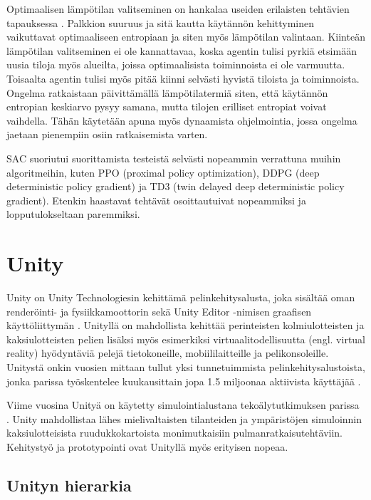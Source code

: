 \documentclass[utf8]{gradu3}
\begin{document}
Optimaalisen lämpötilan valitseminen on hankalaa useiden erilaisten tehtävien tapauksessa \parencite{haarnoja2018app}. Palkkion suuruus ja sitä kautta käytännön kehittyminen vaikuttavat optimaaliseen entropiaan ja siten myös lämpötilan valintaan. Kiinteän lämpötilan valitseminen ei ole kannattavaa, koska agentin tulisi pyrkiä etsimään uusia tiloja myös alueilta, joissa optimaalisista toiminnoista ei ole varmuutta. Toisaalta agentin tulisi myös pitää kiinni selvästi hyvistä tiloista ja toiminnoista. Ongelma ratkaistaan päivittämällä lämpötilatermiä siten, että käytännön entropian keskiarvo pysyy samana, mutta tilojen erilliset entropiat voivat vaihdella. Tähän käytetään apuna myös dynaamista ohjelmointia, jossa ongelma jaetaan pienempiin osiin ratkaisemista varten.

SAC suoriutui \textcite{haarnoja2018app} suorittamista testeistä selvästi nopeammin verrattuna muihin algoritmeihin, kuten PPO (proximal policy optimization), DDPG (deep deterministic policy gradient) ja TD3 (twin delayed deep deterministic policy gradient). Etenkin haastavat tehtävät osoittautuivat nopeammiksi ja lopputulokseltaan paremmiksi.

\chapter{Unity}
\label{unity}

Unity on Unity Technologiesin kehittämä pelinkehitysalusta, joka sisältää oman renderöinti- ja fysiikkamoottorin sekä Unity Editor -nimisen graafisen käyttöliittymän \parencite{juliani2018unity}. Unityllä on mahdollista kehittää perinteisten kolmiulotteisten ja kaksiulotteisten pelien lisäksi myös esimerkiksi virtuaalitodellisuutta (engl. virtual reality) hyödyntäviä pelejä tietokoneille, mobiililaitteille ja pelikonsoleille. Unitystä onkin vuosien mittaan tullut yksi tunnetuimmista pelinkehitysalustoista, jonka parissa työskentelee kuukausittain jopa 1.5 miljoonaa aktiivista käyttäjää \parencite{unityweb}.

Viime vuosina Unityä on käytetty simulointialustana tekoälytutkimuksen parissa \parencite{juliani2018unity}. Unity mahdollistaa lähes mielivaltaisten tilanteiden ja ympäristöjen simuloinnin kaksiulotteisista ruudukkokartoista monimutkaisiin pulmanratkaisutehtäviin. Kehitystyö ja prototypointi ovat Unityllä myös erityisen nopeaa.

\section{Unityn hierarkia}
\end{document}
